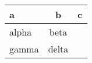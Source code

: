 \begin{table}
\centering
\begin{tabular}{lc|r|}
a 	 & b 	 & c \\ \hline \hline
alpha 	 & beta 	 &  \\ \hline 	 %
gamma 	 & delta 	 &  \\ \hline 	 %
 \hline
\end{tabular}
\end{table}